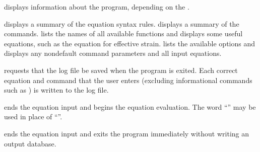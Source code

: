 \newpage %
 {
 displays information about the \caps{\PROGRAM} program,
depending on the .

 {
displays a summary of the equation syntax rules.
}
 {
displays a summary of the commands.
}
 {
lists the names of all available functions and displays some useful
equations, such as the equation for effective strain.
}
 {
lists the available  options and displays any nondefault
command parameters and all input equations.
}
}

 {
 requests that the log file be saved when the program is
exited. Each correct equation and command that the user enters
(excluding informational commands such as ) is written to the
log file.
}

 {
 ends the equation input and begins the equation evaluation.
The word ``'' may be used in place of ``''.
}

 {
 ends the equation input and exits the program immediately
without writing an output database.
}
